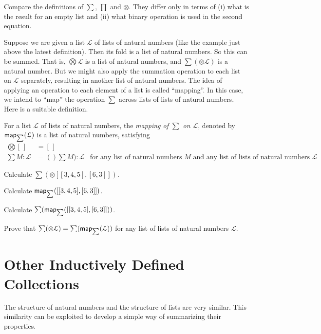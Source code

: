 Compare the definitions of $\sum$, $\prod$ and $\otimes$. They differ only in terms of (i) what is the result for an empty list
and (ii) what binary operation is used in the second equation.

Suppose we are given a list $\mathcal L$ of lists of natural numbers (like the example just above the latest definition). Then its fold is a list of natural numbers. So this can be summed. That is, $\bigotimes \mathcal L$ is a list of natural numbers, and $\sum(\otimes \mathcal L)$ is a natural number. But we might also apply the summation operation to each list on $\mathcal L$ separately, resulting in another list of natural numbers.
The idea of applying an operation to each element of a list is called ``mapping''. In this case, we intend to ``map'' the operation $\sum$
across lists of lists of natural numbers. Here is a suitable definition.

\begin{defn}
	For a list $\mathcal L$ of lists of natural numbers, the \emph{mapping of $\sum$
		 on $\mathcal L$}, denoted by $\mathord{\textsf{map}}_{\sum}(\mathcal L)$
	is a list of natural numbers, satisfying
	\begin{align*}
	\bigotimes[\,] &= [\,]\\
	\sum M:\mathcal L &= ()\sum M): \mathcal L &\text{for any list of natural numbers $M$ and any list of lists of natural numbers $\mathcal L$}
	\end{align*}
\end{defn}

\begin{exer}
	\begin{exercise} 
	\item Calculate $\sum(\otimes[[3,4,5],[6,3]])$.
	\item Calculate $\mathord{\textsf{map}}_{\sum}([[3,4,5],[6,3]])$.
	\item Calculate $\sum(\mathord{\textsf{map}}_{\sum}([[3,4,5],[6,3]]))$.
	\item Prove that $\sum(\otimes\mathcal L) = \sum(\mathord{\textsf{map}}_{\sum}(\mathcal L))$ for any list of lists of natural numbers $\mathcal L$.
	\end{exercise}
\end{exer}


\section{Other Inductively Defined Collections}

The structure of natural numbers and the structure of lists are very similar. This similarity can be exploited to 
develop a simple way of summarizing their properties.


